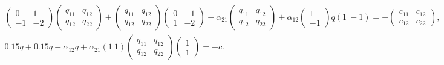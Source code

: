 \begin{gather*} 


\begin{pmatrix} 


0 & 1 \\ -1 & -2 


\end{pmatrix} 


\begin{pmatrix} 


q_{11} & q_{12} \\ q_{12} & q_{22} 


\end{pmatrix} 


+ 


\begin{pmatrix} 


q_{11} & q_{12} \\ q_{12} & q_{22} 


\end{pmatrix} 


\begin{pmatrix} 


0 & -1 \\ 1 & -2 


\end{pmatrix} 


-\alpha_{21} 


\begin{pmatrix} 


q_{11} & q_{12} \\ q_{12} & q_{22} 


\end{pmatrix} 


+\alpha_{12}\begin{pmatrix}1 \\-1 \end{pmatrix}q(1\ -1)=- 


\begin{pmatrix} 


c_{11} & c_{12} \\ c_{12} & c_{22} 


\end{pmatrix} 


, \\ 


% 


0.15q+0.15q-\alpha_{12}q+\alpha_{21}(1\ 1) 


\begin{pmatrix} 


q_{11} & q_{12} \\ q_{12} & q_{22} 


\end{pmatrix} 


\begin{pmatrix}1 \\1 \end{pmatrix}=-c.


\end{gather*} 


